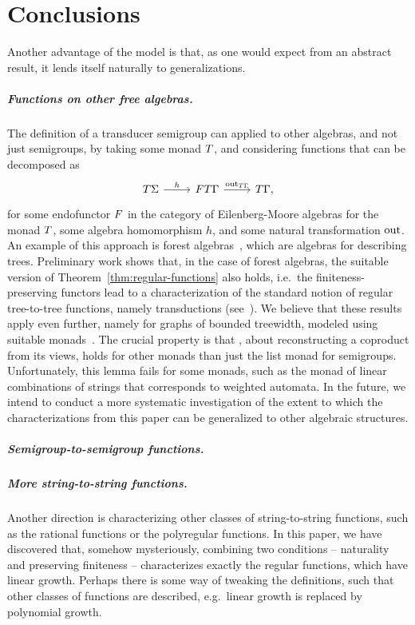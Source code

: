 \section{Conclusions}\label{sec:conclusion}

Another advantage of the model is that, as one would expect from an abstract result, it lends itself naturally to generalizations. 

\subparagraph{Functions on other free algebras.} The definition of a transducer semigroup can applied to other algebras, and not just semigroups, by taking some monad $\monad$, and considering functions that can be decomposed as 
\[
\begin{tikzcd}
    \functort \Sigma 
    \ar[r,"h"]
    & 
    \functor \functort \Gamma
    \ar[r,"\outfun_{\functort \Gamma}"]
    &
    \functort \Gamma,
\end{tikzcd}
\]
for some endofunctor $\functor$ in the category of Eilenberg-Moore algebras for the monad $\monad$, some algebra homomorphism $h$, and some natural transformation $\mathrm{out}$. An example of this approach is forest algebras~\cite[Section 5]{bojanczyk_recobook}, which are algebras for describing trees. Preliminary work shows that, in the case of forest algebras, the suitable version of Theorem~\ref{thm:regular-functions} also holds, i.e.~the finiteness-preserving functors lead to a characterization of the standard notion of regular tree-to-tree functions, namely \mso transductions (see~\cite{MacroMSO,FOTree}). We believe that these results apply even further, namely for graphs of bounded treewidth, modeled using suitable monads~\cite[Section 6]{bojanczyk_recobook}. The crucial property is that , about reconstructing a coproduct from its views, holds for other monads than just the list monad for semigroups. Unfortunately, this lemma fails for some monads, such as the monad of linear combinations of strings that corresponds to weighted automata. In the future, we intend to conduct a more systematic investigation of the extent to which the characterizations from this paper can be generalized to other algebraic structures.

\subparagraph{Semigroup-to-semigroup functions.}


\subparagraph{More string-to-string functions.} Another direction is characterizing other classes of string-to-string functions, such as the rational functions or the polyregular functions. In this paper, we have discovered that, somehow mysteriously, combining two conditions -- naturality and preserving finiteness -- characterizes exactly the regular functions, which have linear growth. Perhaps there is some way of tweaking the definitions, such that other classes of functions are described, e.g.~linear growth is replaced by polynomial growth.

